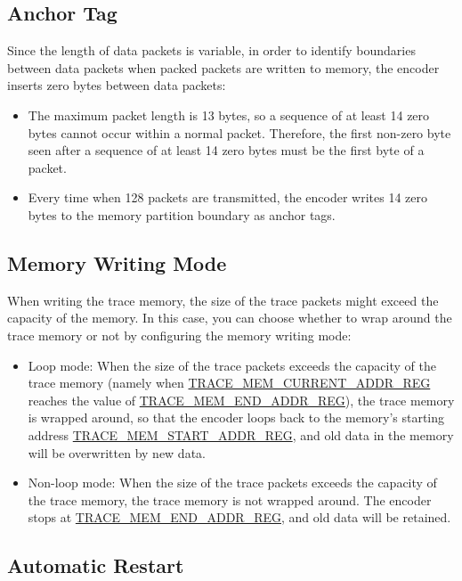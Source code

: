 \documentclass[main\_\_EN.tex]{subfiles}
\begin{document}
\subsection{Anchor Tag}

Since the length of data packets is variable, in order to identify boundaries between data packets when packed packets are written to memory, the \chipname{} encoder inserts zero bytes between data packets:
\begin{itemize}
    \item The maximum packet length is 13 bytes, so a sequence of at least 14 zero bytes cannot occur within a normal packet. Therefore, the first non-zero byte seen after a sequence of at least 14 zero bytes must be the first byte of a packet.
    \item Every time when 128 packets are transmitted, the encoder writes 14 zero bytes to the memory partition boundary as anchor tags.
\end{itemize}

\subsection{Memory Writing Mode}

When writing the trace memory, the size of the trace packets might exceed the capacity of the memory. In this case, you can choose whether to wrap around the trace memory or not by configuring the memory writing mode:

\begin{itemize}
    \item Loop mode: When the size of the trace packets exceeds the capacity of the trace memory (namely when \hyperref[regdesc:TRACEMEMCURRENTADDRREG]{TRACE\_MEM\_CURRENT\_ADDR\_REG} reaches the value of \hyperref[regdesc:TRACEMEMENDADDRREG]{TRACE\_MEM\_END\_ADDR\_REG}), the trace memory is wrapped around, so that the encoder loops back to the memory's starting address \hyperref[regdesc:TRACEMEMSTARTADDRREG]{TRACE\_MEM\_START\_ADDR\_REG}, and old data in the memory will be overwritten by new data.
    \item Non-loop mode: When the size of the trace packets exceeds the capacity of the trace memory, the trace memory is not wrapped around. The encoder stops at \hyperref[regdesc:TRACEMEMENDADDRREG]{TRACE\_MEM\_END\_ADDR\_REG}, and old data will be retained.
\end{itemize}

\subsection{Automatic Restart}
\end{document}
